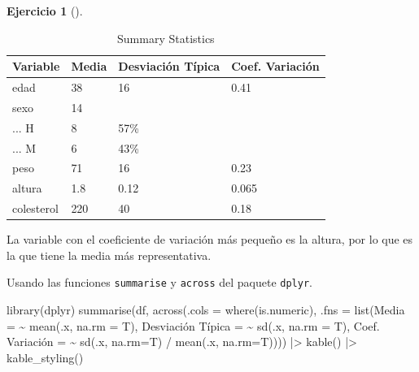 \documentclass[
  a4paper,
]{scrreport}
\newenvironment{Shaded}{\begin{snugshade}}{\end{snugshade}}
\newcommand{\AttributeTok}[1]{\textcolor[rgb]{0.40,0.45,0.13}{#1}}
\newcommand{\ErrorTok}[1]{\textcolor[rgb]{0.68,0.00,0.00}{#1}}
\newcommand{\FunctionTok}[1]{\textcolor[rgb]{0.28,0.35,0.67}{#1}}
\newcommand{\NormalTok}[1]{\textcolor[rgb]{0.00,0.23,0.31}{#1}}
\newcommand{\OtherTok}[1]{\textcolor[rgb]{0.00,0.23,0.31}{#1}}
\newcommand{\SpecialCharTok}[1]{\textcolor[rgb]{0.37,0.37,0.37}{#1}}
\newcommand{\StringTok}[1]{\textcolor[rgb]{0.13,0.47,0.30}{#1}}
\theoremstyle{definition}
\newtheorem{exercise}{Ejercicio}[chapter]
\theoremstyle{remark}
\begin{document}
\begin{exercise}[]
\begin{enumerate}
\begin{tcolorbox}
\begin{table}
  \caption{Summary Statistics}
  \centering
  \begin{tabular}[t]{llll}
  \toprule
  Variable & Media & Desviación Típica & Coef. Variación\\
  \midrule
  edad & 38 & 16 & 0.41\\
  sexo & 14 &  & \\
  ... H & 8 & 57\% & \\
  ... M & 6 & 43\% & \\
  peso & 71 & 16 & 0.23\\
  \addlinespace
  altura & 1.8 & 0.12 & 0.065\\
  colesterol & 220 & 40 & 0.18\\
  \bottomrule
  \end{tabular}
  \end{table}

  La variable con el coeficiente de variación más pequeño es la altura,
  por lo que es la que tiene la media más representativa.

  \end{tcolorbox}

  \begin{tcolorbox}[enhanced jigsaw, breakable, toptitle=1mm, colbacktitle=quarto-callout-tip-color!10!white, rightrule=.15mm, opacityback=0, opacitybacktitle=0.6, titlerule=0mm, coltitle=black, colframe=quarto-callout-tip-color-frame, colback=white, bottomtitle=1mm, leftrule=.75mm, toprule=.15mm, title=\textcolor{quarto-callout-tip-color}{\faLightbulb}\hspace{0.5em}{Solución 2}, arc=.35mm, bottomrule=.15mm, left=2mm]

  Usando las funciones \texttt{summarise} y \texttt{across} del paquete
  \texttt{dplyr}.

\begin{Shaded}
\begin{Highlighting}[]
\FunctionTok{library}\NormalTok{(dplyr)}
\FunctionTok{summarise}\NormalTok{(df, }\FunctionTok{across}\NormalTok{(}\AttributeTok{.cols =} \FunctionTok{where}\NormalTok{(is.numeric), }\AttributeTok{.fns =} \FunctionTok{list}\NormalTok{(}\AttributeTok{Media =} \SpecialCharTok{\textasciitilde{}} \FunctionTok{mean}\NormalTok{(.x, }\AttributeTok{na.rm =}\NormalTok{ T), }\StringTok{\textasciigrave{}}\AttributeTok{Desviación Típica}\StringTok{\textasciigrave{}} \OtherTok{=} \ErrorTok{\textasciitilde{}} \FunctionTok{sd}\NormalTok{(.x, }\AttributeTok{na.rm =}\NormalTok{ T), }\StringTok{\textasciigrave{}}\AttributeTok{Coef. Variación}\StringTok{\textasciigrave{}} \OtherTok{=} \ErrorTok{\textasciitilde{}} \FunctionTok{sd}\NormalTok{(.x, }\AttributeTok{na.rm=}\NormalTok{T) }\SpecialCharTok{/} \FunctionTok{mean}\NormalTok{(.x, }\AttributeTok{na.rm=}\NormalTok{T)))) }\SpecialCharTok{|\textgreater{}}
\FunctionTok{kable}\NormalTok{() }\SpecialCharTok{|\textgreater{}}
\FunctionTok{kable\_styling}\NormalTok{()}
\end{Highlighting}
\end{Shaded}


\end{tcolorbox}
\end{enumerate}
\end{exercise}
\end{document}
